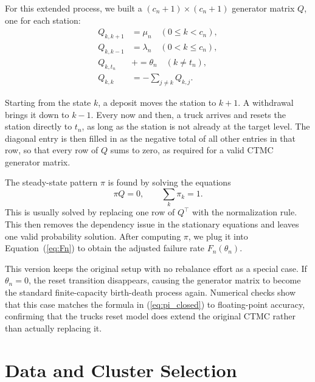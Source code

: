 \documentclass[conference]{IEEEtran}
\begin{document}
For this extended process, we built a $(c_n+1)\times(c_n+1)$ generator matrix $Q$, one for each station:
\begin{align}
Q_{k,k+1} &= \mu_n \quad (0 \le k < c_n), \nonumber \\
Q_{k,k-1} &= \lambda_n \quad (0 < k \le c_n), \nonumber \\
Q_{k,t_n} &\mathrel{+}= \theta_n \quad (k \ne t_n), \label{eq:Q}\\
Q_{k,k} &= -\sum_{j \ne k} Q_{k,j}. \nonumber
\end{align}

Starting from the state $k$, a deposit moves the station to $k+1$. A withdrawal brings it down to $k-1$. Every now and then, a truck arrives and resets the station directly to $t_n$, as long as the station is not already at the target level. The diagonal entry is then filled in as the negative total of all other entries in that row, so that every row of $Q$ sums to zero, as required for a valid CTMC generator matrix.

The steady-state pattern $\pi$ is found by solving the equations
\[
\pi Q = 0, \qquad \sum_k \pi_k = 1.
\]
This is usually solved by replacing one row of $Q^\top$ with the normalization rule. This then removes the dependency issue in the stationary equations and leaves one valid probability solution. After computing $\pi$, we plug it into Equation~(\ref{eq:Fn}) to obtain the adjusted failure rate $F_n(\theta_n)$.

This version keeps the original setup with no rebalance effort as a special case. If $\theta_n=0$, the reset transition disappears, causing the generator matrix to become the standard finite-capacity birth-death process again. Numerical checks show that this case matches the formula in (\ref{eq:pi_closed}) to floating-point accuracy, confirming that the trucks reset model does extend the original CTMC rather than actually replacing it.

\section{Data and Cluster Selection}\label{sec:data}
\end{document}
